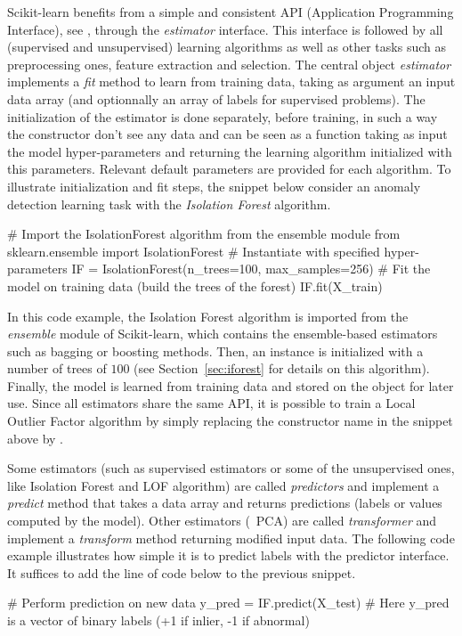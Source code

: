 Scikit-learn benefits from a simple and consistent API (Application Programming Interface), see \cite{sklearn_api2013}, through the \emph{estimator} interface. This interface is followed by all (supervised and unsupervised) learning algorithms as well as other tasks such as preprocessing ones, feature extraction and selection. The central object \emph{estimator} implements a \emph{fit} method to learn from training data, taking as argument an input data array (and optionnally an array of labels for supervised problems). The initialization of the estimator is done separately, before training, in such a way the constructor don't see any data and can be seen as a function taking as input the model hyper-parameters and returning the learning algorithm initialized with this parameters. Relevant default parameters are provided for each algorithm. To illustrate initialization and fit steps, the snippet below consider an anomaly detection learning task with the \emph{Isolation Forest} algorithm.

\begin{pythoncode} 
# Import the IsolationForest algorithm from the ensemble module
from sklearn.ensemble import IsolationForest
# Instantiate with specified hyper-parameters
IF = IsolationForest(n_trees=100, max_samples=256)
# Fit the model on training data (build the trees of the forest)
IF.fit(X_train)
\end{pythoncode}
%
In this code example, the Isolation Forest algorithm is imported from the \emph{ensemble} module of Scikit-learn, which contains the ensemble-based estimators such as bagging or boosting methods. Then, an  instance  is initialized with a number of trees of $100$ (see Section~\ref{sec:iforest} for details on this algorithm). Finally, the model is learned from training data  and stored on the  object for later use. Since all estimators share the same API, it is possible to train a Local Outlier Factor algorithm by simply replacing the constructor name  in the snippet above by .

Some estimators (such as supervised estimators or some of the unsupervised ones, like Isolation Forest and LOF algorithm) are called \emph{predictors} and implement a \emph{predict} method that takes a data array and returns predictions (labels or values computed by the model). Other estimators (\eg~PCA) are called \emph{transformer} and implement a \emph{transform} method returning modified input data.
The following code example illustrates how simple it is to predict labels with the predictor interface. It suffices to add the line of code below to the previous snippet.
\begin{pythoncode} 
# Perform prediction on new data
y_pred = IF.predict(X_test)  
# Here y_pred is a vector of binary labels (+1 if inlier, -1 if abnormal)
\end{pythoncode}



